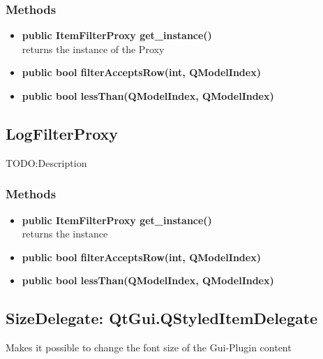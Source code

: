 \subsubsection{Methods}
\begin{itemize}
  
  \item \textbf{public ItemFilterProxy get\_instance()}\\
  returns the instance of the Proxy
  \item \textbf{public bool filterAcceptsRow(int, QModelIndex)}\\
  
  \item \textbf{public bool lessThan(QModelIndex, QModelIndex)}\\
  
\end{itemize}

\subsection{LogFilterProxy}
TODO:Description
\subsubsection{Methods}
\begin{itemize}
  
  \item \textbf{public ItemFilterProxy get\_instance()}\\
  returns the instance
  \item \textbf{public bool filterAcceptsRow(int, QModelIndex)}\\
  
  \item \textbf{public bool lessThan(QModelIndex, QModelIndex)}\\
  
\end{itemize}

\subsection{SizeDelegate: QtGui.QStyledItemDelegate}
Makes it possible to change the font size of the Gui-Plugin content
